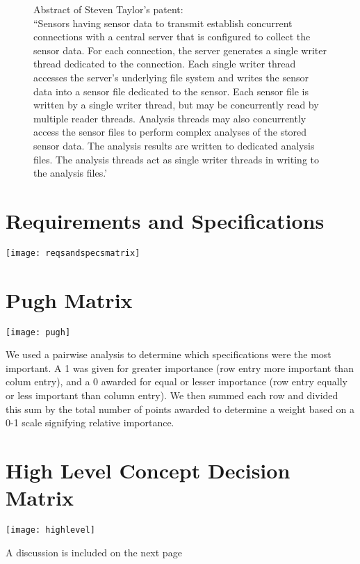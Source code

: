 \documentclass[12pt,letterpaper,titlepage]{article}
\begin{document}
\begin{center}
\begin{figure}[h]
\begin{center}
\end{center}
\vspace{.5in}
Abstract of Steven Taylor's patent: \\

“Sensors having sensor data to transmit establish concurrent connections with a central server that is configured to collect the sensor data. For each connection, the server generates a single writer thread dedicated to the connection. Each single writer thread accesses the server's underlying file system and writes the sensor data into a sensor file dedicated to the sensor. Each sensor file is written by a single writer thread, but may be concurrently read by multiple reader threads. Analysis threads may also concurrently access the sensor files to perform complex analyses of the stored sensor data. The analysis results are written to dedicated analysis files. The analysis threads act as single writer threads in writing to the analysis files.’
\end{figure}
\end{center}

\newpage
\section{Requirements and Specifications}  \label{tab:RequirementsandSpecifications}
\begin{center}
\texttt{[image: reqsandspecsmatrix]}
\end{center}

\newpage
\section{Pugh Matrix} \label{tab:PairwiseComparisonofRequirements}
\texttt{[image: pugh]}

We used a pairwise analysis to determine which specifications were the most important. A 1 was given for greater importance (row entry more important than colum entry), and a 0 awarded for equal or lesser importance (row entry equally or less important than column entry). We then summed each row and divided this sum by the total number of points awarded to determine a weight based on a 0-1 scale signifying relative importance.


\newpage
\section{High Level Concept Decision Matrix} \label{tab:HighLevelConceptDecisionMatrix}
\begin{center}
\texttt{[image: highlevel]}

A discussion is included on the next page
\end{center}
\end{document}
